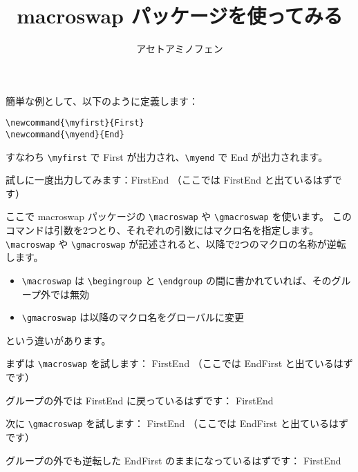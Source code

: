 \documentclass{jsarticle}
\title{\textsf{macroswap} パッケージを使ってみる}
\author{アセトアミノフェン}
\newcommand{\myfirst}{First}
\newcommand{\myend}{End}
\begin{document}
\maketitle

簡単な例として、以下のように定義します：
\begin{verbatim}
\newcommand{\myfirst}{First}
\newcommand{\myend}{End}
\end{verbatim}
すなわち \verb|\myfirst| で First が出力され、\verb|\myend| で End が出力されます。

試しに一度出力してみます：\myfirst \myend
（ここでは FirstEnd と出ているはずです）


ここで \textsf{macroswap} パッケージの \verb|\macroswap| や \verb|\gmacroswap| を使います。
このコマンドは引数を2つとり、それぞれの引数にはマクロ名を指定します。
\verb|\macroswap| や \verb|\gmacroswap| が記述されると、以降で2つのマクロの名称が逆転します。
\begin{itemize}
\item \verb|\macroswap| は \verb|\begingroup| と \verb|\endgroup| の間に書かれていれば、そのグループ外では無効
\item \verb|\gmacroswap| は以降のマクロ名をグローバルに変更
\end{itemize}
という違いがあります。


まずは \verb|\macroswap| を試します：
\begingroup
{}
\myfirst \myend
（ここでは EndFirst と出ているはずです）
\endgroup

グループの外では FirstEnd に戻っているはずです：
\myfirst \myend


次に \verb|\gmacroswap| を試します：
\begingroup
{}
\myfirst \myend
（ここでは EndFirst と出ているはずです）
\endgroup

グループの外でも逆転した EndFirst のままになっているはずです：
\myfirst \myend
\end{document}

